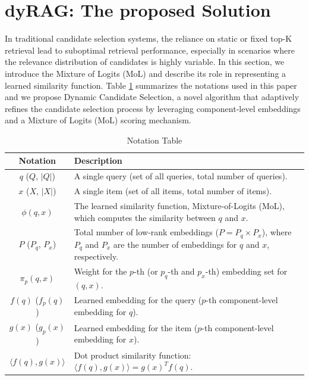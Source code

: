 \documentclass[Afour,sageh,times]{sagej}
\begin{document}
\section{dyRAG: The proposed Solution}\label{sec3}
In traditional candidate selection systems, the reliance on static or fixed top-K retrieval lead to suboptimal retrieval performance, especially in scenarios where the relevance distribution of candidates is highly variable. In this section, we introduce the Mixture of Logits (MoL) and describe its role in representing a learned similarity function. Table \ref{tab:Notations_table} summarizes the notations used in this paper and we propose Dynamic Candidate Selection, a novel algorithm that adaptively refines the candidate selection process by leveraging component-level embeddings and a Mixture of Logits (MoL) scoring mechanism.

\begin{table}[h]
	\centering
	\large  %
	\begin{tabular}{|c|p{5cm}|}  %
		\hline
		\textbf{Notation} & \textbf{Description} \\ \hline
		\( q \) (\( Q \), \( |Q| \)) & A single query (set of all queries, total number of queries). \\ \hline
		\( x \) (\( X \), \( |X| \)) & A single item (set of all items, total number of items). \\ \hline
		\( \phi(q, x) \) & The learned similarity function, Mixture-of-Logits (MoL), which computes the similarity between \( q \) and \( x \). \\ \hline
		\( P \) (\( P_q \), \( P_x \)) & Total number of low-rank embeddings (\( P = P_q \times P_x \)), where \( P_q \) and \( P_x \) are the number of embeddings for \( q \) and \( x \), respectively. \\ \hline
		\( \pi_p(q, x) \)  & Weight for the \( p \)-th (or \( p_q \)-th and \( p_x \)-th) embedding set for \( (q, x) \). \\ \hline
		\( f(q) \) (\( f_p(q) \)) & Learned embedding for the query (\( p \)-th component-level embedding for \( q \)). \\ \hline
		\( g(x) \) (\( g_p(x) \)) & Learned embedding for the item (\( p \)-th component-level embedding for \( x \)). \\ \hline
		\( \langle f(q), g(x) \rangle \) & Dot product similarity function: \( \langle f(q), g(x) \rangle = g(x)^T f(q) \). \\ \hline
	\end{tabular}
	\caption{Notation Table }
	\label{tab:Notations_table}
\end{table}
\end{document}
